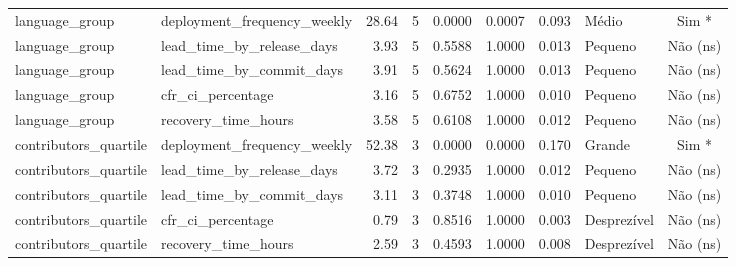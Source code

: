 \begin{table}[htbp]
\begin{tabular}{|l|l|r|c|r|r|r|l|c|}
language_group & deployment_frequency_weekly & 28.64 & 5 & 0.0000 & 0.0007 & 0.093 & Médio & Sim * \\
language_group & lead_time_by_release_days & 3.93 & 5 & 0.5588 & 1.0000 & 0.013 & Pequeno & Não (ns) \\
language_group & lead_time_by_commit_days & 3.91 & 5 & 0.5624 & 1.0000 & 0.013 & Pequeno & Não (ns) \\
language_group & cfr_ci_percentage & 3.16 & 5 & 0.6752 & 1.0000 & 0.010 & Pequeno & Não (ns) \\
language_group & recovery_time_hours & 3.58 & 5 & 0.6108 & 1.0000 & 0.012 & Pequeno & Não (ns) \\
contributors_quartile & deployment_frequency_weekly & 52.38 & 3 & 0.0000 & 0.0000 & 0.170 & Grande & Sim * \\
contributors_quartile & lead_time_by_release_days & 3.72 & 3 & 0.2935 & 1.0000 & 0.012 & Pequeno & Não (ns) \\
contributors_quartile & lead_time_by_commit_days & 3.11 & 3 & 0.3748 & 1.0000 & 0.010 & Pequeno & Não (ns) \\
contributors_quartile & cfr_ci_percentage & 0.79 & 3 & 0.8516 & 1.0000 & 0.003 & Desprezível & Não (ns) \\
contributors_quartile & recovery_time_hours & 2.59 & 3 & 0.4593 & 1.0000 & 0.008 & Desprezível & Não (ns) \\
\hline
\end{tabular}
\end{table}
